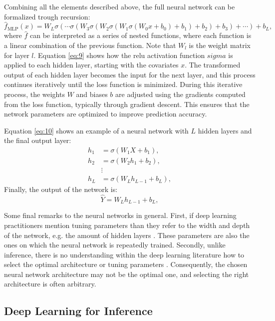 Combining all the elements described above, the full neural network can be formalized trough recursion:
\begin{equation}
\hat{f}_{\text{MLP}}(x) = W_L \sigma \left( \cdots \sigma \left( W_3 \sigma \left( W_2 \sigma \left( W_1 \sigma \left( W_0 x + b_0 \right) + b_1 \right) + b_2 \right) + b_3 \right) + \cdots \right) + b_L,
\label{eq:9}
\end{equation}
where $\hat{f}$ can be interpreted as a series of nested functions, where each function is a linear combination of the previous function.
Note that $W_l$ is the weight matrix for layer $l$.
Equation \ref{eq:9} shows how the \ac{relu} activation function $sigma$ is applied to each hidden layer, starting with the covariates $x$.
The transformed output of each hidden layer becomes the input for the next layer, and this process continues iteratively until the loss function is minimized.
During this iterative process, the weights $W$ and biases $b$ are adjusted using the gradients computed from the loss function, typically through gradient descent.
This ensures that the network parameters are optimized to improve prediction accuracy.

Equation \ref{eq:10} shows an example of a neural network with $L$ hidden layers and the final output layer:
\begin{align}
h_1 &= \sigma(W_1 X + b_1), \nonumber \\
h_2 &= \sigma(W_2 h_1 + b_2), \nonumber  \\
&\vdots \nonumber \\
h_L &= \sigma(W_L h_{L-1} + b_L),
\label{eq:10}
\end{align}
Finally, the output of the network is:
\begin{equation}
\hat{Y} = W_L h_{L-1} + b_L, \nonumber
\end{equation}



Some final remarks to the neural networks in general.
First, if deep learning practitioners mention tuning parameters than they refer to the width and depth of the network, e.g. the amount of hidden layers \citep{farrellDeepNeuralNetworks2021}.
These parameters are also the ones on which the neural network is repeatedly trained.
Secondly, unlike inference, there is no understanding within the deep learning literature how to select the optimal architecture or tuning parameters \citep[see][]{10.1214/19-AOS1875,telgarsky2016benefits}.
Consequently, the chosen neural network architecture may not be the optimal one, and selecting the right architecture is often arbitrary.
\subsection{Deep Learning for Inference}



